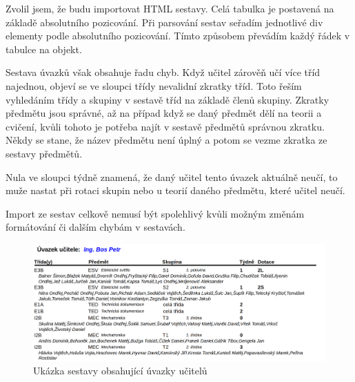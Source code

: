 Zvolil jsem, že budu importovat HTML sestavy.
Celá tabulka je postavená na základě absolutního pozicování.
Při parsování sestav seřadím jednotlivé div elementy podle absolutního pozicování.
Tímto způsobem převádím každý řádek v tabulce na objekt.

Sestava úvazků však obsahuje řadu chyb.
Když učitel zárověň učí více tříd najednou, objeví se ve sloupci třídy nevalidní zkratky tříd. 
Toto řeším vyhledáním třídy a skupiny v sestavě tříd na základě členů skupiny. 
Zkratky předmětu jsou správné, až na případ když se daný předmět dělí na teorii a cvičení,
kvůli tohoto je potřeba najít v sestavě předmětů správnou zkratku.
Někdy se stane, že název předmětu není úplný a potom se vezme zkratka ze sestavy předmětů.


Nula ve sloupci týdně znamená, že daný učitel tento úvazek aktuálně neučí, to muže nastat při rotaci skupin nebo u teorií daného předmětu, které učitel neučí. 

Import ze sestav celkově nemusí být spolehlivý kvůli možným změnám formátování či dalším chybám v sestavách.
\begin{figure}[h]
    \centering
    \includegraphics[width=1\linewidth]{Figures/uvazky-ucitelu-ukazka.png}
    \caption{Ukázka sestavy obsahující úvazky učitelů}
    \label{fig:uvazky-ucitelu-ukazka}
\end{figure}


